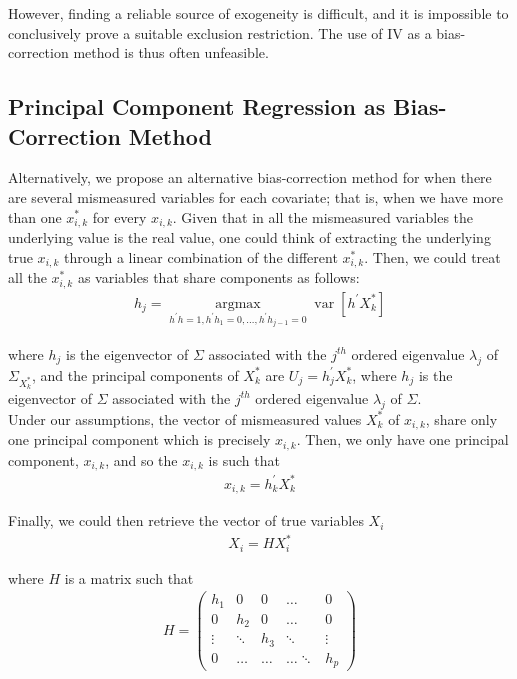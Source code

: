 \documentclass[12pt]{article}
\begin{document}
        However, finding a reliable source of exogeneity is difficult, and it is impossible to conclusively prove a suitable exclusion restriction. The use of IV as a bias-correction method is thus often unfeasible.\\

    \subsection*{Principal Component Regression as Bias-Correction Method}

        Alternatively, we propose an alternative bias-correction method for when there are several mismeasured variables for each covariate; that is, when we have more than one $x_{i,k}^*$ for every $x_{i,k}$. Given that in all the mismeasured variables the underlying value is the real value, one could think of extracting the underlying true $x_{i,k}$ through a linear combination of the different $x_{i,k}^*$. Then, we could treat all the $x_{i,k}^*$ as variables that share components as follows:
        \begin{align}
        h_{j}=\underset{h^{\prime} h=1, h^{\prime} h_{1}=0, \ldots, h^{\prime} h_{j-1}=0}{\operatorname{argmax}} \operatorname{var}\left[h^{\prime} X^*_k\right]  
        \end{align}


        where $h_j$ is the eigenvector of $\Sigma$ associated with the $j^{t h}$ ordered eigenvalue $\lambda_{j}$ of $\Sigma_{X^*_k}$, and the principal components of $X^*_k$ are $U_{j}=h_{j}^{\prime} X^*_k$, where $h_{j}$ is the eigenvector of $\Sigma$ associated with the $j^{t h}$ ordered eigenvalue $\lambda_{j}$ of $\Sigma$.\\

        Under our assumptions, the vector of mismeasured values $X^*_k$ of $x_{i,k}$, share only one principal component which is precisely $x_{i,k}$. Then, we only have one principal component, $x_{i,k}$, and so the $x_{i,k}$ is such that
        \begin{align}
            x_{i,k}=h_{k}^{\prime} X^*_k
        \end{align}

        Finally, we could then retrieve the vector of true variables $X_i$
        \begin{align}
            X_i=HX^*_i
        \end{align}

        where $H$ is a matrix such that
        \begin{align*}
            H=\left(\begin{array}{ccccc}
            h_1 & 0 & 0 & \dots & 0 \\
            0 & h_2 & 0 & \dots & 0 \\
            \vdots & \ddots & h_3 & \ddots & \vdots \\
            0 & \dots & \dots & \dots \ddots & h_p
            \end{array}\right)
        \end{align*}
\end{document}
